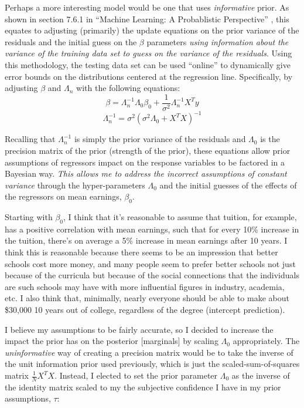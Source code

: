 \documentclass[10pt]{article}
\begin{document}
Perhaps a more interesting model would be one that uses {\it informative} prior. As shown in section 7.6.1 in ``Machine Learning: A Probablistic Perspective'' \cite{murphy2012machine}, this equates to adjusting (primarily) the update equations on the prior variance of the residuals and the initial guess on the $\beta$ parameters {\it using information about the variance of the training data set to guess on the variance of the residuals}. Using this methodology, the testing data set can be used ``online'' to dynamically give error bounds on the distributions centered at the regression line. Specifically, by adjusting $\beta$ and $\Lambda_n$ with the following equations:
$$ \beta = \Lambda_n^{-1} \Lambda_0 \beta_0 + \frac{1}{\sigma^2} \Lambda_n^{-1} X^{T} y $$
$$ \Lambda_n^{-1} = \sigma^2 (\sigma^2 \Lambda_0 + X^{T} X)^{-1}$$

Recalling that $\Lambda_n^{-1}$ is simply the prior variance of the residuals and $\Lambda_0$ is the precision matrix of the prior (strength of the prior), these equations allow prior assumptions of regressors impact on the response variables to be factored in a Bayesian way. {\it This allows me to address the incorrect assumptions of constant variance} through the hyper-parameters $\Lambda_0$ and the initial guesses of the effects of the regressors on mean earnings, $\beta_0$. 

Starting with $\beta_0$, I think that it's reasonable to assume that tuition, for example, has a positive correlation with mean earnings, such that for every 10\% increase in the tuition, there's on average a 5\% increase in mean earnings after 10 years. I think this is reasonable because there seems to be an impression that better schools cost more money, and many people seem to prefer better schools not just because of the curricula but because of the social connections that the individuals are such schools may have with more influential figures in industry, academia, etc. I also think that, minimally, nearly everyone should be able to make about \$30,000 10 years out of college, regardless of the degree (intercept prediction).

I believe my assumptions to be fairly accurate, so I decided to increase the impact the prior has on the posterior [marginals] by scaling $\Lambda_0$ appropriately. The {\it uninformative} way of creating a precision matrix would be to take the inverse of the unit information prior used previously, which is just the scaled-sum-of-squares matrix $\frac{1}{N} X^{T}X$. Instead, I elected to set the prior parameter $\Lambda_0$ as the inverse of the identity matrix scaled to my the subjective confidence I have in my prior assumptions, $\tau$: 
\end{document}
